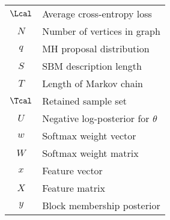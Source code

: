 \begin{table}[!h]
\begin{tabular}{c|l}
			  $\Lcal$ & Average cross-entropy loss\\
			  $N$ & Number of vertices in graph \\
			  $q$ & MH proposal distribution\\
			  $S$ & SBM description length\\
			  $T$ & Length of Markov chain\\
			  $\Tcal$ & Retained sample set\\
			  $U$ & Negative log-posterior for $\theta$ \\
			  $w$ & Softmax weight vector\\
			  $W$ & Softmax weight matrix\\
			  $x$ & Feature vector \\
			  $X$ & Feature matrix \\
			  $y$ & Block membership posterior \\
	\end{tabular}
\end{table}
